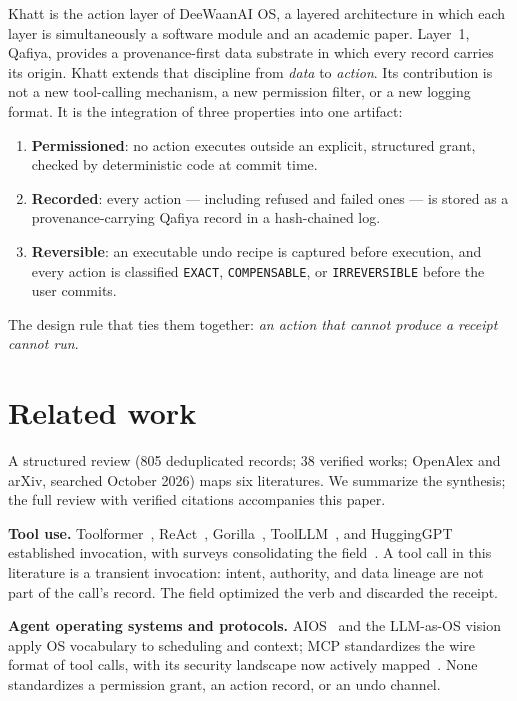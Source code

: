 \documentclass[11pt]{article}
\newcommand{\sys}{Khatt}
\begin{document}
\sys{} is the action layer of DeeWaanAI OS, a layered architecture in which each
layer is simultaneously a software module and an academic paper. Layer~1, Qafiya,
provides a provenance-first data substrate in which every record carries its
origin. \sys{} extends that discipline from \emph{data} to \emph{action}. Its
contribution is not a new tool-calling mechanism, a new permission filter, or a
new logging format. It is the integration of three properties into one artifact:

\begin{enumerate}[nosep]
  \item \textbf{Permissioned}: no action executes outside an explicit,
        structured grant, checked by deterministic code at commit time.
  \item \textbf{Recorded}: every action --- including refused and failed ones ---
        is stored as a provenance-carrying Qafiya record in a hash-chained log.
  \item \textbf{Reversible}: an executable undo recipe is captured before
        execution, and every action is classified \texttt{EXACT},
        \texttt{COMPENSABLE}, or \texttt{IRREVERSIBLE} before the user commits.
\end{enumerate}

The design rule that ties them together: \emph{an action that cannot produce a
receipt cannot run}.

\section{Related work}

A structured review (805 deduplicated records; 38 verified works; OpenAlex and
arXiv, searched October 2026) maps six literatures. We summarize the synthesis;
the full review with verified citations accompanies this paper.

\textbf{Tool use.} Toolformer~\cite{toolformer}, ReAct~\cite{react},
Gorilla~\cite{gorilla}, ToolLLM~\cite{toolllm}, and HuggingGPT~\cite{hugginggpt}
established invocation, with surveys consolidating the
field~\cite{toolsurvey,agenticsurvey}. A tool call in this literature is a
transient invocation: intent, authority, and data lineage are not part of the
call's record. The field optimized the verb and discarded the receipt.

\textbf{Agent operating systems and protocols.} AIOS~\cite{aios} and the
LLM-as-OS vision~\cite{llmos} apply OS vocabulary to scheduling and context;
MCP standardizes the wire format of tool calls, with its security landscape now
actively mapped~\cite{mcplandscape}. None standardizes a permission grant, an
action record, or an undo channel.
\end{document}
